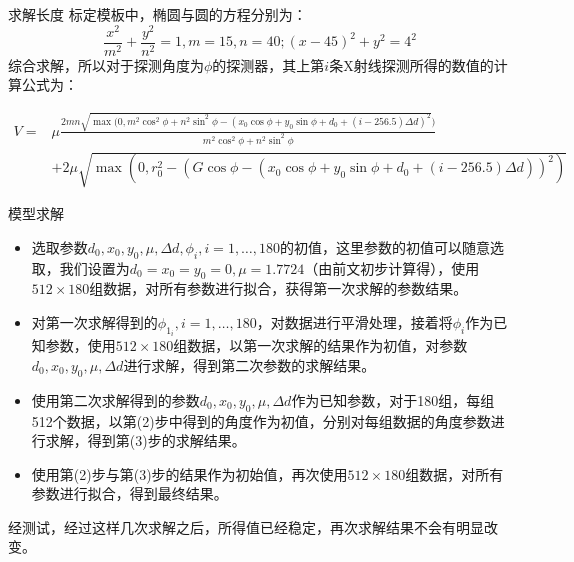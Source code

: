\documentclass{beamer}
\begin{document}
\begin{frame}{求解长度}
	标定模板中，椭圆与圆的方程分别为：
	\[\frac{x^2}{m^2} + \frac{y^2}{n^2} = 1,m = 15,n = 40;(x - 45)^2 + y^2 = 4^2\]
	综合求解，所以对于探测角度为\(\phi\)的探测器，其上第\(i\)条X射线探测所得的数值的计算公式为：
	\begin{tiny}
		\begin{align*}\label{va}
			V = & \mu\frac{2mn\sqrt{\max(0,m^2\cos^2\phi + n^2\sin^2\phi - (x_0\cos\phi + y_0\sin\phi + d_0 +  (i - 256.5)\Delta d)^2})}{ m^2\cos^2\phi + n^2\sin^2\phi} \\
			    & + 2\mu\sqrt{\max(0,r_0^2 - (G\cos\phi - (x_0\cos\phi + y_0\sin\phi + d_0 +  (i - 256.5)\Delta d))^2)}                                                  
		\end{align*}
	\end{tiny}
\end{frame}

\begin{frame}{模型求解}
	\begin{itemize}
		\item 选取参数\(d_0,x_0,y_0,\mu,\Delta d,\phi_i,i=1,\ldots,180\)的初值，这里参数的初值可以随意选取，我们设置为\(d_0 = x_0 = y_0 =  0,\mu = 1.7724\)（由前文初步计算得），使用\(512\times 180\)组数据，对所有参数进行拟合，获得第一次求解的参数结果。
		\item 对第一次求解得到的\(\phi_{1_i},i=1,\ldots,180\)，对数据进行平滑处理，接着将\(\phi_i\)作为已知参数，使用\(512\times 180\)组数据，以第一次求解的结果作为初值，对参数\(d_0,x_0,y_0,\mu,\Delta d\)进行求解，得到第二次参数的求解结果。
	\end{itemize}
\end{frame}

\begin{frame}
	\begin{itemize}
		\item 使用第二次求解得到的参数\(d_0,x_0,y_0,\mu,\Delta d\)作为已知参数，对于180组，每组512个数据，以第(2)步中得到的角度作为初值，分别对每组数据的角度参数进行求解，得到第(3)步的求解结果。
		\item 使用第(2)步与第(3)步的结果作为初始值，再次使用\(512\times 180\)组数据，对所有参数进行拟合，得到最终结果。
	\end{itemize}
	经测试，经过这样几次求解之后，所得值已经稳定，再次求解结果不会有明显改变。
\end{frame}
\end{document}
